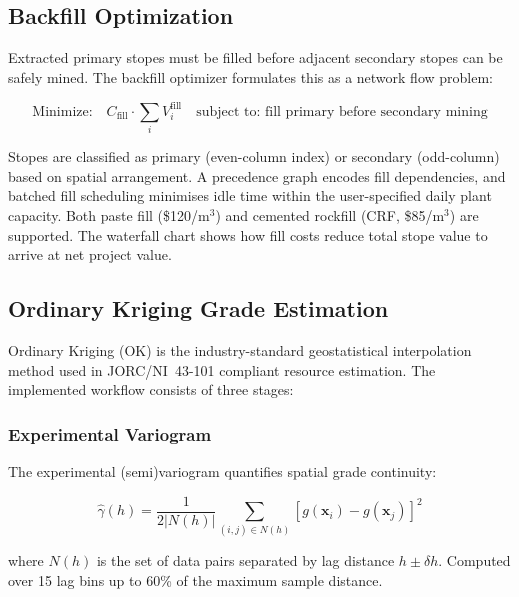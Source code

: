 \documentclass[12pt,a4paper]{article}
\begin{document}
\subsection{Backfill Optimization}
\label{sec:backfill}

Extracted primary stopes must be filled before adjacent secondary stopes can be safely mined. The backfill optimizer formulates this as a network flow problem:

\begin{equation}
  \text{Minimize:} \quad C_{\text{fill}} \cdot \sum_i V_i^{\text{fill}}
  \quad \text{subject to: fill primary before secondary mining}
\end{equation}

Stopes are classified as primary (even-column index) or secondary (odd-column) based on spatial arrangement. A precedence graph encodes fill dependencies, and batched fill scheduling minimises idle time within the user-specified daily plant capacity. Both paste fill (\$120/m$^3$) and cemented rockfill (CRF, \$85/m$^3$) are supported. The waterfall chart shows how fill costs reduce total stope value to arrive at net project value.

\subsection{Ordinary Kriging Grade Estimation}
\label{sec:kriging}

Ordinary Kriging (OK) is the industry-standard geostatistical interpolation method used in JORC/NI~43-101 compliant resource estimation. The implemented workflow consists of three stages:

\subsubsection{Experimental Variogram}

The experimental (semi)variogram quantifies spatial grade continuity:

\begin{equation}
    \hat{\gamma}(h) = \frac{1}{2 |N(h)|} \sum_{(i,j) \in N(h)} \left[ g(\mathbf{x}_i) - g(\mathbf{x}_j) \right]^2
\end{equation}

where $N(h)$ is the set of data pairs separated by lag distance $h \pm \delta h$. Computed over 15 lag bins up to 60\% of the maximum sample distance.
\end{document}
